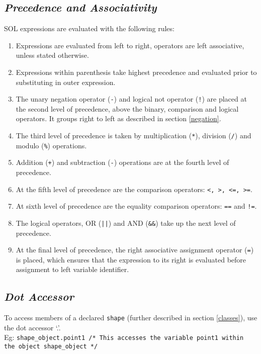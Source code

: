 \documentclass[letterpaper,12pt]{article}
\begin{document}
	\subsection{\textit{Precedence and Associativity}} \label{precedence}
	SOL expressions are evaluated with the following rules:
	\begin{enumerate}
		\itemsep0em
		\item Expressions are evaluated from left to right, operators are left associative, unless stated otherwise.

        \item Expressions within parenthesis take highest precedence and evaluated prior to substituting in outer expression.
        
        \item The unary negation operator (\texttt{-}) and logical not operator (\texttt{!}) are placed at the second level of precedence, above the binary, comparison and logical operators. It groups right to left as described in section \ref{negation}.
		
        \item The third level of precedence is taken by multiplication (\texttt{*}), division (\texttt{/}) and modulo (\texttt{\%}) operations.
        
        \item Addition (\texttt{+}) and subtraction (\texttt{-}) operations are at the fourth level of precedence.
		
        \item At the fifth level of precedence are the comparison operators: \texttt{\textless, \textgreater, \textless=, \textgreater=}.

        \item At sixth level of precedence are the equality comparison operators: \texttt{==} and \texttt{!=}.

        \item The logical operators, OR (\texttt{||}) and AND (\texttt{\&\&}) take up the next level of precedence.

        \item At the final level of precedence, the right associative assignment operator (\texttt{=}) is placed, which ensures that the expression to its right is evaluated before assignment to left variable identifier.

	\end{enumerate}
	
	\subsection{\textit{Dot Accessor}}
	To access members of a declared \texttt{shape} (further described in section \ref{classes}), use the dot accessor `.'. \\
	Eg: \texttt{shape\_object.point1 /* This accesses the variable point1 within the object shape\_object */}
\end{document}
